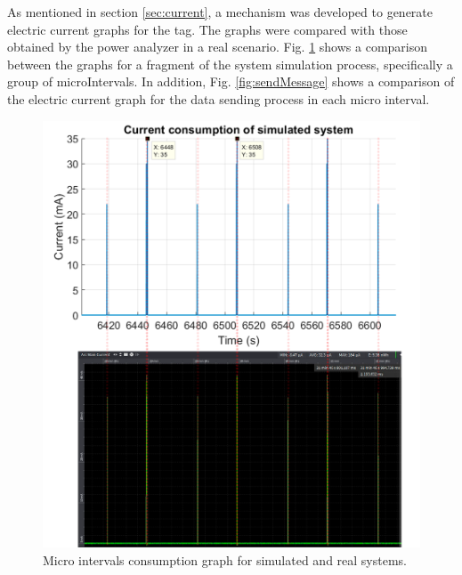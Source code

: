 \documentclass[journal]{IEEEtran}	%
\begin{document}
As mentioned in section \ref{sec:current}, a mechanism was developed to generate electric current graphs for the tag. The graphs were compared with those obtained by the power analyzer in a real scenario. Fig. \ref{fig:microIntervals} shows a comparison between the graphs for a fragment of the system simulation process, specifically a group of microIntervals. In addition, Fig. \ref{fig:sendMessage} shows a comparison of the electric current graph for the data sending process in each micro interval.

\begin{figure}[t!]
\centering
\includegraphics[width=0.99\columnwidth]{microIntervalsAll.png}
\caption{Micro intervals consumption graph for simulated and real systems.}
\label{fig:microIntervals}
\end{figure}
\end{document}
